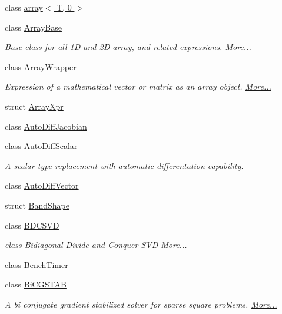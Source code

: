 \begin{DoxyCompactItemize}
\item 
class \hyperlink{class_eigen_1_1array_3_01_t_00_010_01_4}{array$<$ T, 0 $>$}
\item 
class \hyperlink{group___core___module_class_eigen_1_1_array_base}{Array\+Base}
\begin{DoxyCompactList}\small\item\em Base class for all 1D and 2D array, and related expressions.  \hyperlink{group___core___module_class_eigen_1_1_array_base}{More...}\end{DoxyCompactList}\item 
class \hyperlink{group___core___module_class_eigen_1_1_array_wrapper}{Array\+Wrapper}
\begin{DoxyCompactList}\small\item\em Expression of a mathematical vector or matrix as an array object.  \hyperlink{group___core___module_class_eigen_1_1_array_wrapper}{More...}\end{DoxyCompactList}\item 
struct \hyperlink{struct_eigen_1_1_array_xpr}{Array\+Xpr}
\item 
class \hyperlink{class_eigen_1_1_auto_diff_jacobian}{Auto\+Diff\+Jacobian}
\item 
class \hyperlink{class_eigen_1_1_auto_diff_scalar}{Auto\+Diff\+Scalar}
\begin{DoxyCompactList}\small\item\em A scalar type replacement with automatic differentation capability. \end{DoxyCompactList}\item 
class \hyperlink{class_eigen_1_1_auto_diff_vector}{Auto\+Diff\+Vector}
\item 
struct \hyperlink{struct_eigen_1_1_band_shape}{Band\+Shape}
\item 
class \hyperlink{group___s_v_d___module_class_eigen_1_1_b_d_c_s_v_d}{B\+D\+C\+S\+VD}
\begin{DoxyCompactList}\small\item\em class Bidiagonal Divide and Conquer S\+VD  \hyperlink{group___s_v_d___module_class_eigen_1_1_b_d_c_s_v_d}{More...}\end{DoxyCompactList}\item 
class \hyperlink{class_eigen_1_1_bench_timer}{Bench\+Timer}
\item 
class \hyperlink{group___iterative_linear_solvers___module_class_eigen_1_1_bi_c_g_s_t_a_b}{Bi\+C\+G\+S\+T\+AB}
\begin{DoxyCompactList}\small\item\em A bi conjugate gradient stabilized solver for sparse square problems.  \hyperlink{group___iterative_linear_solvers___module_class_eigen_1_1_bi_c_g_s_t_a_b}{More...}\end{DoxyCompactList}\item 

\end{DoxyCompactItemize}
